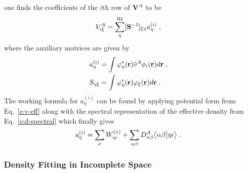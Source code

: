 %
one finds the coefficients of the $i$th row of ${\bf V}^A$ to be
%
\begin{equation}
  V^A_{i\xi} = \sum_\eta^{\rm RI} [{\bf S}^{-1}]_{\xi\eta} a^{(i)}_\eta \;,
\end{equation}
%
where the auxiliary matrices are given by
%
\begin{subequations}
\begin{align}
 a^{(i)}_\eta &= \int \varphi^*_\eta({\bf r}) \hat{v}^A \phi_i({\bf r}) d{\bf r} \;,\\  
 S_{\eta\xi}  &= \int \varphi^*_\eta({\bf r}) \varphi_\xi({\bf r}) d{\bf r} \;.
\end{align}
\end{subequations}
%
%
The working formula for $a^{(i)}_\eta$ can be found by applying 
potential form from Eq.~\eqref{e:v-eff}
along with the spectral representation of the effective density from Eq.~\eqref{e:d-spectral} 
which finally gives
%
\begin{equation}
 a^{(i)}_\eta = \sum_{x} W_{\eta i}^{(x)} + 
 \sum_{\alpha\beta} D^A_{\alpha\beta} 
  \bigl\langle {\alpha\beta} \bigl\lvert {\eta i} \bigr\rangle \;.
\end{equation}
%

\subsubsection{Density Fitting in Incomplete Space}

